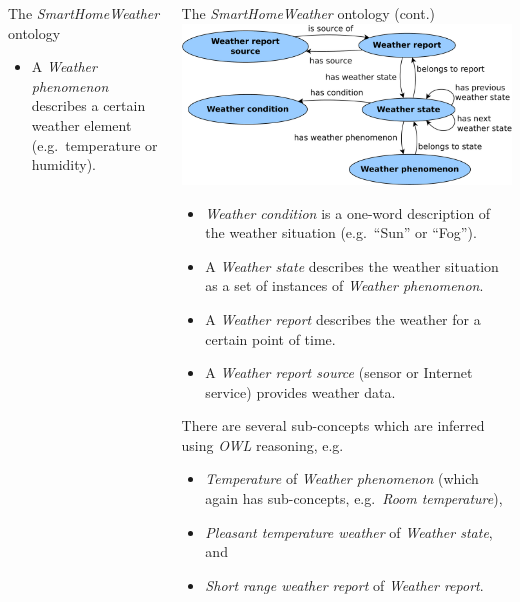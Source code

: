 \documentclass[final,hyperref={pdfpagelabels=true}]{beamer}
\begin{document}
\begin{frame}[fragile]
\begin{columns}[t]
\begin{column}{.45\textwidth}
\begin{block}{The \emph{SmartHomeWeather} ontology}
	\begin{itemize}
	  \item A \emph{Weather phenomenon} describes a certain weather
		  element (e.g.\ temperature or humidity).
	\end{itemize}
      \end{block}
    \end{column}

    \begin{column}{.45\textwidth}
      \begin{block}{The \emph{SmartHomeWeather} ontology (cont.)}
	\includegraphics[width=\textwidth]{figures/dia/binary-relations}
	\begin{itemize}
	  \item \emph{Weather condition} is a one-word description of the
		  weather situation (e.g.\ ``Sun'' or ``Fog'').
	  \item A \emph{Weather state} describes the weather situation as a
		  set of instances of \emph{Weather phenomenon}.
          \item A \emph{Weather report} describes the weather for a certain
		  point of time.
	  \item A \emph{Weather report source} (sensor or Internet service)
		  provides weather data.
	\end{itemize}

	There are several sub-concepts which are inferred using \emph{OWL} reasoning, e.g.\ 
	\begin{itemize}
	  \item \emph{Temperature} of \emph{Weather phenomenon} (which again has sub-concepts, e.g.\
		  \emph{Room temperature}),
	  \item \emph{Pleasant temperature weather} of \emph{Weather state}, and
	  \item \emph{Short range weather report} of \emph{Weather report}.
	\end{itemize}


\end{block}
\end{column}
\end{columns}
\end{frame}
\end{document}
